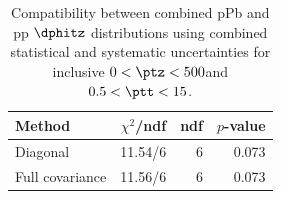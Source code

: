 \begin{table}[htp!]
\centering
\begin{tabular}{|l|r|r|r|}
\hline
Method & $\chi^2$/ndf & ndf & $p$-value \\
\hline
Diagonal & 11.54/6 & 6 & 0.073 \\
Full covariance & 11.56/6 & 6 & 0.073 \\
\hline
\end{tabular}
\caption{Compatibility between combined pPb and pp $\dphitz$ distributions using combined statistical and systematic uncertainties for inclusive $0 < \ptz < 500$\GeV and $0.5 < \ptt < 15$\GeV.}
\label{table:chisq_dphi}
\end{table}
